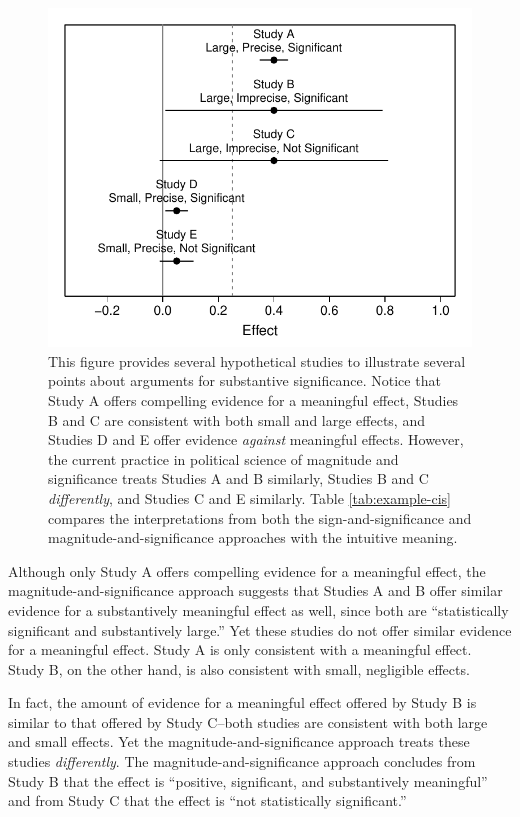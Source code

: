 \documentclass[12pt]{article}
\begin{document}
\begin{figure}[H]
\begin{center}
\includegraphics[scale = .8]{figs/example-cis.pdf}
\caption{This figure provides several hypothetical studies to illustrate several points about arguments for substantive significance. Notice that Study A offers compelling evidence for a meaningful effect, Studies B and C are consistent with both small and large effects, and Studies D and E offer evidence \emph{against} meaningful effects. However, the current practice in political science of magnitude and significance treats Studies A and B similarly, Studies B and C \emph{differently}, and Studies C and E similarly. Table \ref{tab:example-cis} compares the interpretations from both the sign-and-significance and magnitude-and-significance approaches with the intuitive meaning.}\label{fig:example-cis}
\end{center}
\end{figure}

Although only Study A offers compelling evidence for a meaningful effect, the magnitude-and-significance approach suggests that Studies A and B offer similar evidence for a substantively meaningful effect as well, since both are ``statistically significant and substantively large.''  Yet these studies do not offer similar evidence for a meaningful effect. Study A is only consistent with a meaningful effect. Study B, on the other hand, is also consistent with small, negligible effects.

In fact, the amount of evidence for a meaningful effect offered by Study B is similar to that offered by Study C--both studies are consistent with both large and small effects. Yet the magnitude-and-significance approach treats these studies \emph{differently}. The magnitude-and-significance approach concludes from Study B that the effect is ``positive, significant, and substantively meaningful''  and from Study C that the effect is ``not statistically significant.''
\end{document}
